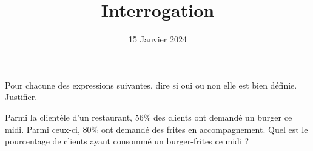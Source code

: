 \documentclass{exam}
\title{Interrogation}
\author{}
\date{15 Janvier 2024}
\begin{document}
\begin{questions}
\question Pour chacune des expressions suivantes, dire si oui ou non elle est bien définie. Justifier.
\question Parmi la clientèle d'un restaurant, $56\%$ des clients ont demandé un burger ce midi. Parmi ceux-ci, $80\%$ ont demandé des frites en accompagnement. Quel est le pourcentage de clients ayant consommé un burger-frites ce midi ?
\end{questions}
\end{document}
